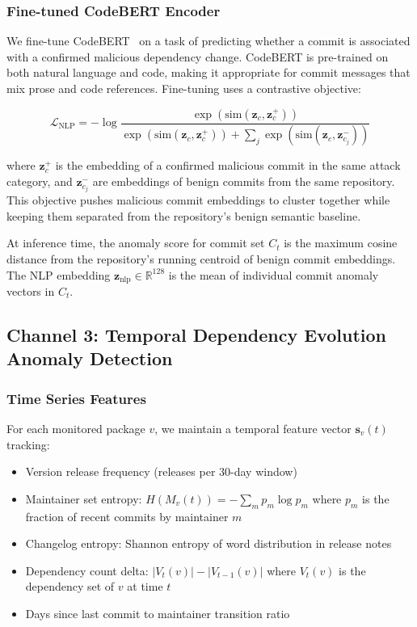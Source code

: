 \documentclass[sigconf,nonacm]{acmart}
\begin{document}
\subsubsection{Fine-tuned CodeBERT Encoder}

We fine-tune CodeBERT~\cite{feng2020codebert} on a task of predicting whether a
commit is associated with a confirmed malicious dependency change. CodeBERT is
pre-trained on both natural language and code, making it appropriate for commit
messages that mix prose and code references. Fine-tuning uses a contrastive
objective:

\begin{equation}
  \mathcal{L}_\text{NLP} = -\log \frac{\exp(\text{sim}(\mathbf{z}_c,
  \mathbf{z}_c^+))}{\exp(\text{sim}(\mathbf{z}_c, \mathbf{z}_c^+)) +
  \sum_j \exp(\text{sim}(\mathbf{z}_c, \mathbf{z}_{c_j}^-))}
\end{equation}

where $\mathbf{z}_c^+$ is the embedding of a confirmed malicious commit in the
same attack category, and $\mathbf{z}_{c_j}^-$ are embeddings of benign commits
from the same repository. This objective pushes malicious commit embeddings to
cluster together while keeping them separated from the repository's benign
semantic baseline.

At inference time, the anomaly score for commit set $C_t$ is the maximum cosine
distance from the repository's running centroid of benign commit embeddings.
The NLP embedding $\mathbf{z}_\text{nlp} \in \mathbb{R}^{128}$ is the mean of
individual commit anomaly vectors in $C_t$.

\subsection{Channel 3: Temporal Dependency Evolution Anomaly Detection}

\subsubsection{Time Series Features}

For each monitored package $v$, we maintain a temporal feature vector
$\mathbf{s}_v(t)$ tracking:
\begin{itemize}
  \item Version release frequency (releases per 30-day window)
  \item Maintainer set entropy: $H(M_v(t)) = -\sum_m p_m \log p_m$ where $p_m$
        is the fraction of recent commits by maintainer $m$
  \item Changelog entropy: Shannon entropy of word distribution in release notes
  \item Dependency count delta: $|V_{t}(v)| - |V_{t-1}(v)|$ where
        $V_{t}(v)$ is the dependency set of $v$ at time $t$
  \item Days since last commit to maintainer transition ratio
\end{itemize}
\end{document}
